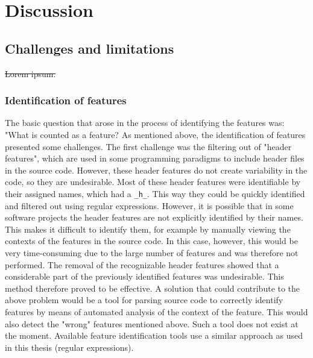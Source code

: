 
\section{Discussion}

\subsection{Challenges and limitations}
\st{Lorem ipsum.}

\subsubsection*{Identification of features}
The basic question that arose in the process of identifying the features was: "What is counted as a feature? As mentioned above, the identification of features presented some challenges. The first challenge was the filtering out of "header features", which are used in some programming paradigms to include header files in the source code. However, these header features do not create variability in the code, so they are undesirable. Most of these header features were identifiable by their assigned names, which had a \texttt{\_h\_}. This way they could be quickly identified and filtered out using regular expressions. However, it is possible that in some software projects the header features are not explicitly identified by their names. This makes it difficult to identify them, for example by manually viewing the contexts of the features in the source code. In this case, however, this would be very time-consuming due to the large number of features and was therefore not performed. The removal of the recognizable header features showed that a considerable part of the previously identified features was undesirable. This method therefore proved to be effective. A solution that could contribute to the above problem would be a tool for parsing source code to correctly identify features by means of automated analysis of the context of the feature. This would also detect the "wrong" features mentioned above. Such a tool does not exist at the moment. Available feature identification tools use a similar approach as used in this thesis (regular expressions).

